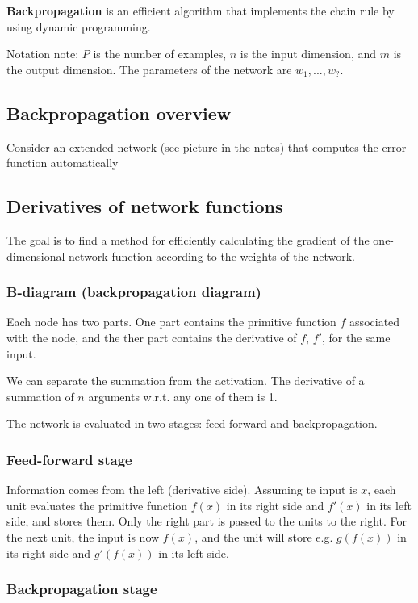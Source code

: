 \documentclass[a4paper,12pt]{article}
\begin{document}
\textbf{Backpropagation} is an efficient algorithm that implements the chain rule by using dynamic programming. 

Notation note: $P$ is the number of examples, $n$ is the input dimension, and $m$ is the output dimension. The parameters of the network are $w_1, ..., w_?$.

\subsection{Backpropagation overview}

Consider an extended network (see picture in the notes) that computes the error function automatically

\subsection{Derivatives of network functions}

The goal is to find a method for efficiently calculating the gradient of the one-dimensional network function according to the weights of the network. 

\subsubsection{B-diagram (backpropagation diagram)}

Each node has two parts. One part contains the primitive function $f$ associated with the node, and the ther part contains the derivative of $f$, $f'$, for the same input. 

We can separate the summation from the activation. The derivative of a summation of $n$ arguments w.r.t. any one of them is 1. 

The network is evaluated in two stages: feed-forward and backpropagation. 

\subsubsection{Feed-forward stage}

Information comes from the left (derivative side). Assuming te input is $x$, each unit evaluates the primitive function $f(x)$ in its right side and $f'(x)$ in its left side, and stores them. Only the right part is passed to the units to the right. For the next unit, the input is now $f(x)$, and the unit will store e.g. $g(f(x))$ in its right side and $g'(f(x))$ in its left side. 

\subsubsection{Backpropagation stage}
\end{document}
